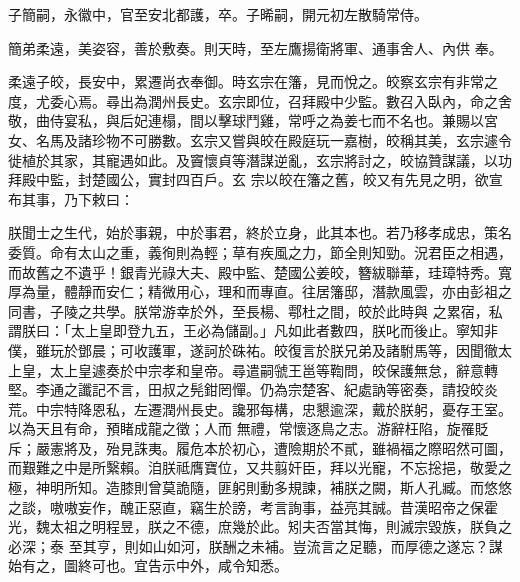 \begin{pinyinscope}
 子簡嗣，永徽中，官至安北都護，卒。子晞嗣，開元初左散騎常侍。



 簡弟柔遠，美姿容，善於敷奏。則天時，至左鷹揚衛將軍、通事舍人、內供
 奉。



 柔遠子皎，長安中，累遷尚衣奉御。時玄宗在籓，見而悅之。皎察玄宗有非常之度，尤委心焉。尋出為潤州長史。玄宗即位，召拜殿中少監。數召入臥內，命之舍敬，曲侍宴私，與后妃連榻，間以擊球鬥雞，常呼之為姜七而不名也。兼賜以宮女、名馬及諸珍物不可勝數。玄宗又嘗與皎在殿庭玩一嘉樹，皎稱其美，玄宗遽令徙植於其家，其寵遇如此。及竇懷貞等潛謀逆亂，玄宗將討之，皎協贊謀議，以功拜殿中監，封楚國公，實封四百戶。玄
 宗以皎在籓之舊，皎又有先見之明，欲宣布其事，乃下敕曰：



 朕聞士之生代，始於事親，中於事君，終於立身，此其本也。若乃移孝成忠，策名委質。命有太山之重，義徇則為輕；草有疾風之力，節全則知勁。況君臣之相遇，而故舊之不遺乎！銀青光祿大夫、殿中監、楚國公姜皎，簪紱聯華，珪璋特秀。寬厚為量，體靜而安仁；精微用心，理和而專直。往居籓邸，潛款風雲，亦由彭祖之同書，子陵之共學。朕常游幸於外，至長楊、鄠杜之間，皎於此時與
 之累宿，私謂朕曰：「太上皇即登九五，王必為儲副。」凡如此者數四，朕叱而後止。寧知非僕，雖玩於鄧晨；可收護軍，遂訶於硃祐。皎復言於朕兄弟及諸駙馬等，因聞徹太上皇，太上皇遽奏於中宗孝和皇帝。尋遣嗣虢王邕等鞫問，皎保護無怠，辭意轉堅。李通之讖記不言，田叔之髡鉗罔憚。仍為宗楚客、紀處訥等密奏，請投皎炎荒。中宗特降恩私，左遷潤州長史。讒邪每構，忠懇逾深，戴於朕躬，憂存王室。以為天且有命，預睹成龍之徵；人而
 無禮，常懷逐鳥之志。游辭枉陷，旋罹貶斥；嚴憲將及，殆見誅夷。履危本於初心，遭險期於不貳，雖禍福之際昭然可圖，而艱難之中是所繄賴。洎朕祗膺寶位，又共翦奸臣，拜以光寵，不忘捴挹，敬愛之極，神明所知。造膝則曾莫詭隨，匪躬則動多規諫，補朕之闕，斯人孔臧。而悠悠之談，嗷嗷妄作，醜正惡直，竊生於謗，考言詢事，益亮其誠。昔漢昭帝之保霍光，魏太祖之明程昱，朕之不德，庶幾於此。矧夫否當其悔，則滅宗毀族，朕負之必深；泰
 至其亨，則如山如河，朕酬之未補。豈流言之足聽，而厚德之遂忘？謀始有之，圖終可也。宜告示中外，咸令知悉。




\end{pinyinscope}
